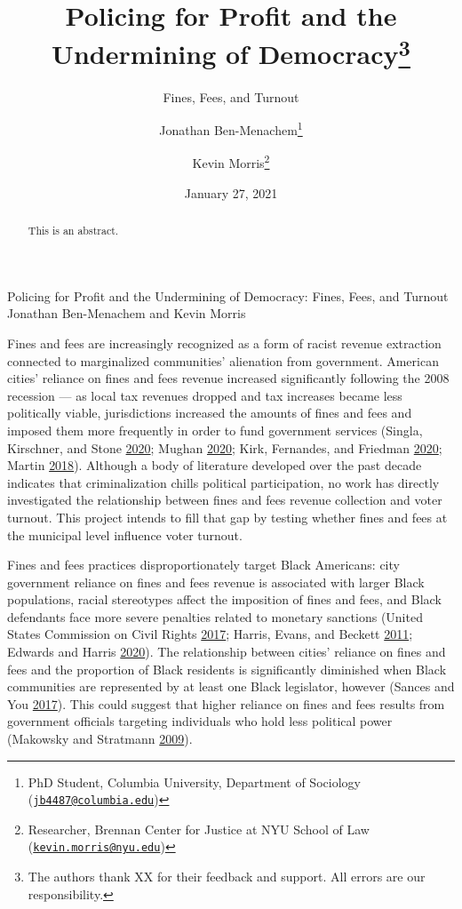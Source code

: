 \documentclass[
  12pt,
]{article}
\title{Policing for Profit and the Undermining of Democracy\thanks{The authors thank XX for their feedback and support. All errors are our responsibility.}}
\subtitle{Fines, Fees, and Turnout}
\author{Jonathan Ben-Menachem\footnote{PhD Student, Columbia University, Department of Sociology (\href{mailto:jb4487@columbia.edu}{\nolinkurl{jb4487@columbia.edu}})} \and Kevin Morris\footnote{Researcher, Brennan Center for Justice at NYU School of Law (\href{mailto:kevin.morris@nyu.edu}{\nolinkurl{kevin.morris@nyu.edu}})}}
\date{January 27, 2021}
\begin{document}
\maketitle
\begin{abstract}
This is an abstract.
\end{abstract}

\pagebreak

\begin{center}
Policing for Profit and the Undermining of Democracy: Fines, Fees, and Turnout \\
Jonathan Ben-Menachem and Kevin Morris
\end{center}

Fines and fees are increasingly recognized as a form of racist revenue extraction connected to marginalized communities' alienation from government. American cities' reliance on fines and fees revenue increased significantly following the 2008 recession --- as local tax revenues dropped and tax increases became less politically viable, jurisdictions increased the amounts of fines and fees and imposed them more frequently in order to fund government services (Singla, Kirschner, and Stone \protect\hyperlink{ref-Singla2020}{2020}; Mughan \protect\hyperlink{ref-Mughan2020}{2020}; Kirk, Fernandes, and Friedman \protect\hyperlink{ref-Kirk2020}{2020}; Martin \protect\hyperlink{ref-Martin2018}{2018}). Although a body of literature developed over the past decade indicates that criminalization chills political participation, no work has directly investigated the relationship between fines and fees revenue collection and voter turnout. This project intends to fill that gap by testing whether fines and fees at the municipal level influence voter turnout.

Fines and fees practices disproportionately target Black Americans: city government reliance on fines and fees revenue is associated with larger Black populations, racial stereotypes affect the imposition of fines and fees, and Black defendants face more severe penalties related to monetary sanctions (United States Commission on Civil Rights \protect\hyperlink{ref-UnitedStatesCommissiononCivilRights2017}{2017}; Harris, Evans, and Beckett \protect\hyperlink{ref-Harris2011}{2011}; Edwards and Harris \protect\hyperlink{ref-Edwards2020}{2020}). The relationship between cities' reliance on fines and fees and the proportion of Black residents is significantly diminished when Black communities are represented by at least one Black legislator, however (Sances and You \protect\hyperlink{ref-Sances2017}{2017}). This could suggest that higher reliance on fines and fees results from government officials targeting individuals who hold less political power (Makowsky and Stratmann \protect\hyperlink{ref-Makowsky2009}{2009}).
\end{document}
